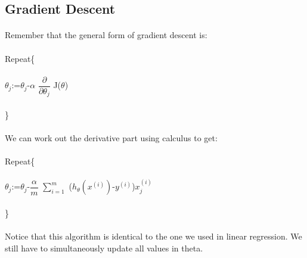 \documentclass[UTF8]{ctexart}
\begin{document}
\subsection{Gradient Descent}
\paragraph{}
Remember that the general form of gradient descent is:
\begin{algorithm}
\paragraph{}
Repeat\{ 
\paragraph{}

$\theta_{j}$:=$\theta_{j}$-$\alpha$ $\dfrac{\partial}{\partial\theta_{j}}$ J($\theta$)
\paragraph{}
\}
\end{algorithm}
\paragraph{}
We can work out the derivative part using calculus to get:
\paragraph{}
\begin{algorithm}
\paragraph{}
Repeat\{ 
\paragraph{}
$\theta_{j}$:=$\theta_{j}$-$\dfrac{\alpha}{m}$ $\sum\limits_{i=1}^{m}$ ($h_{\theta}(x^{(i)})$-$y^{(i)}$)$x_{j}^{(i)}$
\paragraph{}
\}
\end{algorithm}
\paragraph{}
Notice that this algorithm is identical to the one we used in linear regression. We still have to simultaneously update all values in theta.
\end{document}

